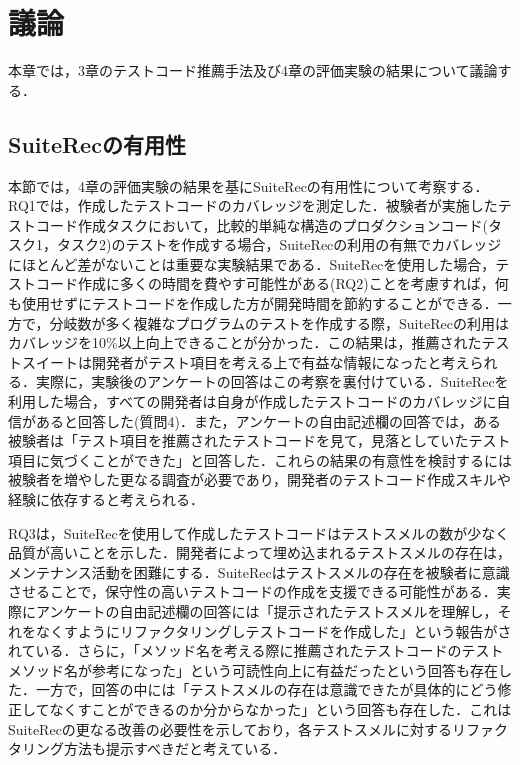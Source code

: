 \documentclass[12pt]{jarticle} %
\begin{document}
\newpage
\section{議論}

本章では，3章のテストコード推薦手法及び4章の評価実験の結果について議論する．

\subsection{SuiteRecの有用性}
本節では，4章の評価実験の結果を基に{\sf SuiteRec}の有用性について考察する．RQ1では，作成したテストコードのカバレッジを測定した．被験者が実施したテストコード作成タスクにおいて，比較的単純な構造のプロダクションコード(タスク1，タスク2)のテストを作成する場合，{\sf SuiteRec}の利用の有無でカバレッジにほとんど差がないことは重要な実験結果である．{\sf SuiteRec}を使用した場合，テストコード作成に多くの時間を費やす可能性がある(RQ2)ことを考慮すれば，何も使用せずにテストコードを作成した方が開発時間を節約することができる．一方で，分岐数が多く複雑なプログラムのテストを作成する際，{\sf SuiteRec}の利用はカバレッジを10\%以上向上できることが分かった．この結果は，推薦されたテストスイートは開発者がテスト項目を考える上で有益な情報になったと考えられる．実際に，実験後のアンケートの回答はこの考察を裏付けている．{\sf SuiteRec}を利用した場合，すべての開発者は自身が作成したテストコードのカバレッジに自信があると回答した(質問4)．また，アンケートの自由記述欄の回答では，ある被験者は「テスト項目を推薦されたテストコードを見て，見落としていたテスト項目に気づくことができた」と回答した．これらの結果の有意性を検討するには被験者を増やした更なる調査が必要であり，開発者のテストコード作成スキルや経験に依存すると考えられる．

RQ3は，{\sf SuiteRec}を使用して作成したテストコードはテストスメルの数が少なく品質が高いことを示した．開発者によって埋め込まれるテストスメルの存在は，メンテナンス活動を困難にする．{\sf SuiteRec}はテストスメルの存在を被験者に意識させることで，保守性の高いテストコードの作成を支援できる可能性がある．実際にアンケートの自由記述欄の回答には「提示されたテストスメルを理解し，それをなくすようにリファクタリングしテストコードを作成した」という報告がされている．さらに，「メソッド名を考える際に推薦されたテストコードのテストメソッド名が参考になった」という可読性向上に有益だったという回答も存在した．一方で，回答の中には「テストスメルの存在は意識できたが具体的にどう修正してなくすことができるのか分からなかった」という回答も存在した．これは{\sf SuiteRec}の更なる改善の必要性を示しており，各テストスメルに対するリファクタリング方法も提示すべきだと考えている．
\end{document}
